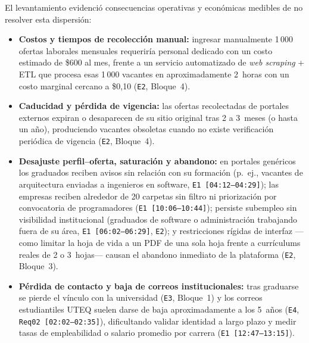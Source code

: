 \documentclass[11pt,a4paper]{article}
\begin{document}
El levantamiento evidenció consecuencias operativas y económicas medibles de no resolver esta dispersión:
\begin{itemize}
    \item \textbf{Costos y tiempos de recolección manual:} ingresar manualmente 1\,000 ofertas laborales mensuales requeriría personal dedicado con un costo estimado de \$600 al mes, frente a un servicio automatizado de \textit{web scraping} + ETL que procesa esas 1\,000 vacantes en aproximadamente 2~horas con un costo marginal cercano a \$0,10 (\texttt{E2}, Bloque~4).
    \item \textbf{Caducidad y pérdida de vigencia:} las ofertas recolectadas de portales externos expiran o desaparecen de su sitio original tras 2 a 3~meses (o hasta un año), produciendo vacantes obsoletas cuando no existe verificación periódica de vigencia (\texttt{E2}, Bloque~4).
    \item \textbf{Desajuste perfil--oferta, saturación y abandono:} en portales genéricos los graduados reciben avisos sin relación con su formación (p.~ej., vacantes de arquitectura enviadas a ingenieros en software, \texttt{E1 [04:12--04:29]}); las empresas reciben alrededor de 20 carpetas sin filtro ni priorización por convocatoria de programadores (\texttt{E1 [10:06--10:44]}); persiste subempleo sin visibilidad institucional (graduados de software o administración trabajando fuera de su área, \texttt{E1 [06:02--06:29]}, \texttt{E2}); y restricciones rígidas de interfaz ---como limitar la hoja de vida a un PDF de una sola hoja frente a currículums reales de 2 o 3~hojas--- causan el abandono inmediato de la plataforma (\texttt{E2}, Bloque~3).
    \item \textbf{Pérdida de contacto y baja de correos institucionales:} tras graduarse se pierde el vínculo con la universidad (\texttt{E3}, Bloque~1) y los correos estudiantiles UTEQ suelen darse de baja aproximadamente a los 5~años (\texttt{E4}, \texttt{Req02 [02:02--02:35]}), dificultando validar identidad a largo plazo y medir tasas de empleabilidad o salario promedio por carrera (\texttt{E1 [12:47--13:15]}).
\end{itemize}
\end{document}
